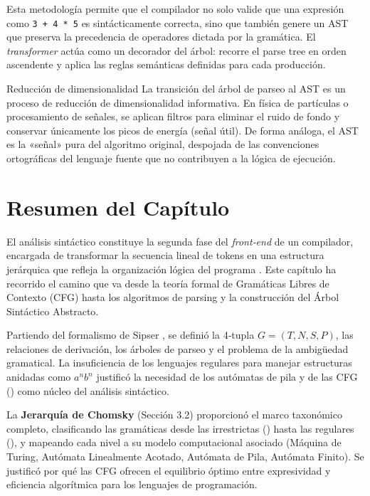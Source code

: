 Esta metodología permite que el compilador no solo valide que una expresión como \texttt{3 + 4 * 5} es sintácticamente correcta, sino que también genere un AST que preserva la precedencia de operadores dictada por la gramática. El \textit{transformer} actúa como un decorador del árbol: recorre el parse tree en orden ascendente y aplica las reglas semánticas definidas para cada producción.

\begin{fisicaconexion}{Reducción de dimensionalidad}
La transición del árbol de parseo al AST es un proceso de reducción de dimensionalidad informativa. En física de partículas o procesamiento de señales, se aplican filtros para eliminar el ruido de fondo y conservar únicamente los picos de energía (señal útil). De forma análoga, el AST es la «señal» pura del algoritmo original, despojada de las convenciones ortográficas del lenguaje fuente que no contribuyen a la lógica de ejecución.
\end{fisicaconexion}


\section*{Resumen del Capítulo}

El análisis sintáctico constituye la segunda fase del \textit{front‑end} de un compilador, encargada de transformar la secuencia lineal de tokens en una estructura jerárquica que refleja la organización lógica del programa \cite{aho2006compilers}. Este capítulo ha recorrido el camino que va desde la teoría formal de Gramáticas Libres de Contexto (CFG) hasta los algoritmos de parsing y la construcción del Árbol Sintáctico Abstracto.

Partiendo del formalismo de Sipser \cite{sipser2012introduction}, se definió la 4‑tupla $G = (T, N, S, P)$, las relaciones de derivación, los árboles de parseo y el problema de la ambigüedad gramatical. La insuficiencia de los lenguajes regulares para manejar estructuras anidadas como $a^n b^n$ justificó la necesidad de los autómatas de pila y de las CFG () como núcleo del análisis sintáctico.

La \textbf{Jerarquía de Chomsky} (Sección 3.2) proporcionó el marco taxonómico completo, clasificando las gramáticas desde las irrestrictas () hasta las regulares (), y mapeando cada nivel a su modelo computacional asociado (Máquina de Turing, Autómata Linealmente Acotado, Autómata de Pila, Autómata Finito). Se justificó por qué las CFG ofrecen el equilibrio óptimo entre expresividad y eficiencia algorítmica para los lenguajes de programación.

